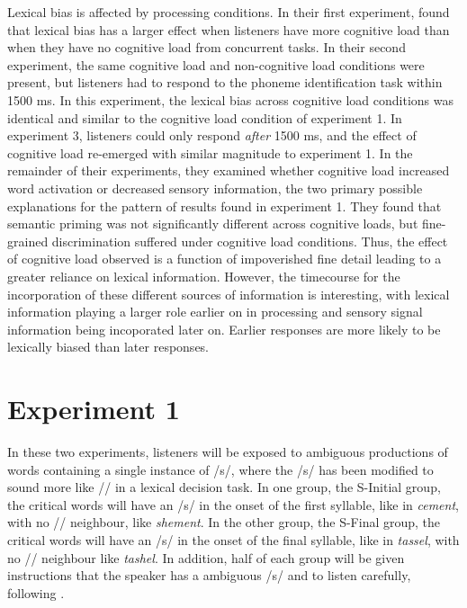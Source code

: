 Lexical bias is affected by processing conditions.  In their first experiment, \citet{Mattys2011} found that lexical bias has a larger effect when listeners have more cognitive load than when they have no cognitive load from concurrent tasks.  In their second experiment, the same cognitive load and non-cognitive load conditions were present, but listeners had to respond to the phoneme identification task within 1500 ms.  In this experiment, the lexical bias across cognitive load conditions was identical and similar to the cognitive load condition of experiment 1.  In experiment 3, listeners could only respond \emph{after} 1500 ms, and the effect of cognitive load re-emerged with similar magnitude to experiment 1.  In the remainder of their experiments, they examined whether cognitive load increased word activation or decreased sensory information, the two primary possible explanations for the pattern of results found in experiment 1.  They found that semantic priming was not significantly different across cognitive loads, but fine-grained discrimination suffered under cognitive load conditions.  Thus, the effect of cognitive load observed is a function of impoverished fine detail leading to a greater reliance on lexical information.  However, the timecourse for the incorporation of these different sources of information is interesting, with lexical information playing a larger role earlier on in processing and sensory signal information being incoporated later on.  Earlier responses are more likely to be lexically biased than later responses.

\section{Experiment 1}

In these two experiments, listeners will be exposed to ambiguous productions of words containing a single instance of /s/, where the /s/ has been modified to sound more like /\textesh/ in a lexical decision task.  In one group, the S-Initial group, the critical words will have an /s/ in the onset of the first syllable, like in \emph{cement}, with no /\textesh/ neighbour, like \emph{shement}.  In the other group, the S-Final group, the critical words will have an /s/ in the onset of the final syllable, like in \emph{tassel}, with no /\textesh/ neighbour like \emph{tashel}.  In addition, half of each group will be given instructions that the speaker has a ambiguous /s/ and to listen carefully, following \citet{Pitt2012}.

